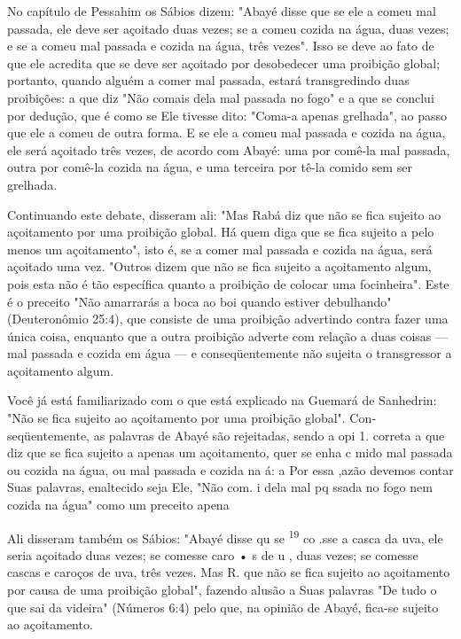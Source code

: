 No capítulo de Pessahim os Sábios dizem: "Abayé disse que se ele a comeu
mal passada, ele deve ser açoitado duas vezes; se a comeu cozida na
água, duas vezes; e se a comeu mal passada e cozida na água, três
vezes". Isso se deve ao fato de que ele acredita que se deve ser
açoitado por desobedecer uma proibição global; portanto, quando alguém a
comer mal passada, estará transgredindo duas proibições: a que diz "Não
comais dela mal passada no fo­go" e a que se conclui por dedução, que é
como se Ele tivesse dito: "Coma-a apenas grelhada", ao passo que ele a
comeu de outra forma. E se ele a comeu mal passada e cozida na água, ele
será açoitado três vezes, de acordo com Aba­yé: uma por comê-la mal
passada, outra por comê-la cozida na água, e uma ter­ceira por tê-la
comido sem ser grelhada.

Continuando este debate, disseram ali: "Mas Rabá diz que não se fi­ca
sujeito ao açoitamento por uma proibição global. Há quem diga que se
fica sujeito a pelo menos um açoitamento", isto é, se a comer mal
passada e cozida na água, será açoitado uma vez. "Outros dizem que não
se fica sujeito a açoita­mento algum, pois esta não é tão específica
quanto a proibição de colocar uma focinheira". Este é o preceito "Não
amarrarás a boca ao boi quando estiver de­bulhando" (Deuteronômio 25:4),
que consiste de uma proibição advertindo con­tra fazer uma única coisa,
enquanto que a outra proibição adverte com relação a duas coisas --- mal
passada e cozida em água --- e conseqüentemente não su­jeita o
transgressor a açoitamento algum.

Você já está familiarizado com o que está explicado na Guemará de
Sanhedrin: "Não se fica sujeito ao açoitamento por uma proibição
global". Con­seqüentemente, as palavras de Abayé são rejeitadas, sendo a
opi 1. correta a que diz que se fica sujeito a apenas um açoitamento,
quer se enha c mido mal passada ou cozida na água, ou mal passada e
cozida na á: a Por essa ,azão devemos contar Suas palavras, enaltecido
seja Ele, "Não com. i dela mal pq ssa­da no fogo nem
cozida na água" como um preceito apena

Ali disseram também os Sábios: "Abayé disse qu se \textsuperscript{19}
co .sse a casca da uva, ele seria açoitado duas vezes;
se comesse caro • s de u , duas vezes; se comesse cascas e caroços de
uva, três vezes. Mas R. que não se fica sujeito ao açoitamento por causa
de uma proibição global", fazendo alu­são a Suas palavras "De tudo o que
sai da videira" (Números 6:4) pelo que, na opinião de Abayé, fica-se
sujeito ao açoitamento.

